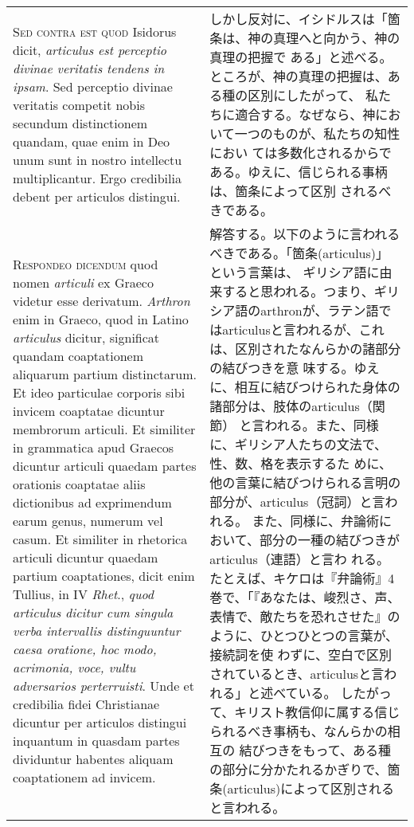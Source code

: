 \documentclass[10pt]{jsarticle} %
\begin{document}
\begin{longtable}{p{21em}p{21em}}
{\scshape Sed contra est quod} Isidorus dicit, {\itshape articulus est
perceptio divinae veritatis tendens in ipsam}. Sed perceptio divinae
veritatis competit nobis secundum distinctionem quandam, quae enim in
Deo unum sunt in nostro intellectu multiplicantur. Ergo credibilia
debent per articulos distingui.

&
しかし反対に、イシドルスは「箇条は、神の真理へと向かう、神の真理の把握で
 ある」と述べる。ところが、神の真理の把握は、ある種の区別にしたがって、
 私たちに適合する。なぜなら、神において一つのものが、私たちの知性におい
 ては多数化されるからである。ゆえに、信じられる事柄は、箇条によって区別
 されるべきである。

\\


{\scshape Respondeo dicendum} quod nomen {\itshape articuli} ex Graeco
videtur esse derivatum. {\itshape Arthron} enim in Graeco, quod in
Latino {\itshape articulus} dicitur, significat quandam coaptationem
aliquarum partium distinctarum. Et ideo particulae corporis sibi invicem
coaptatae dicuntur membrorum articuli. Et similiter in grammatica apud
Graecos dicuntur articuli quaedam partes orationis coaptatae aliis
dictionibus ad exprimendum earum genus, numerum vel casum. Et similiter
in rhetorica articuli dicuntur quaedam partium coaptationes, dicit enim
Tullius, in IV {\itshape Rhet}., {\itshape quod articulus dicitur cum
singula verba intervallis distinguuntur caesa oratione, hoc modo,
acrimonia, voce, vultu adversarios perterruisti}. Unde et credibilia
fidei Christianae dicuntur per articulos distingui inquantum in quasdam
partes dividuntur habentes aliquam coaptationem ad invicem.


&

解答する。以下のように言われるべきである。「箇条(articulus)」という言葉は、
ギリシア語に由来すると思われる。つまり、ギリシア語のarthronが、ラテン語で
はarticulusと言われるが、これは、区別されたなんらかの諸部分の結びつきを意
味する。ゆえに、相互に結びつけられた身体の諸部分は、肢体のarticulus（関節）
と言われる。また、同様に、ギリシア人たちの文法で、性、数、格を表示するた
めに、他の言葉に結びつけられる言明の部分が、articulus（冠詞）と言われる。
また、同様に、弁論術において、部分の一種の結びつきがarticulus（連語）と言わ
れる。たとえば、キケロは『弁論術』4巻で、「『あなたは、峻烈さ、声、
 表情で、敵たちを恐れさせた』のように、ひとつひとつの言葉が、接続詞を使
 わずに、空白で区別されているとき、articulusと言われる」と述べている。
したがって、キリスト教信仰に属する信じられるべき事柄も、なんらかの相互の
 結びつきをもって、ある種の部分に分かたれるかぎりで、箇条(articulus)によって区別されると言われる。



\end{longtable}
\end{document}
